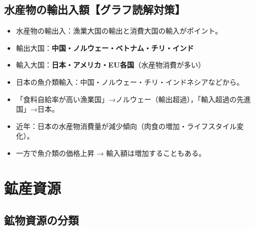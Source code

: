\documentclass[a4paper,11pt]{article}
\newcommand{\imp}[1]{\textbf{\textcolor{mainred}{#1}}}
\begin{document}
\vspace{2mm}

\subsection{水産物の輸出入額【グラフ読解対策】}

\begin{tcolorbox}[notebox, title={水産物の輸出入の統計判定ポイント}]
\begin{itemize}[leftmargin=1em]
  \item 水産物の輸出入：漁業大国の輸出と消費大国の輸入がポイント。
  \item 輸出大国：\imp{中国・ノルウェー・ベトナム・チリ・インド}
  \item 輸入大国：\imp{日本・アメリカ・EU各国}（水産物消費が多い）
  \item 日本の魚介類輸入：中国・ノルウェー・チリ・インドネシアなどから。
  \item 「食料自給率が高い漁業国」→ノルウェー（輸出超過），「輸入超過の先進国」→日本。
  \item 近年：日本の水産物消費量が減少傾向（肉食の増加・ライフスタイル変化）。
  \item 一方で魚介類の価格上昇 → 輸入額は増加することもある。
\end{itemize}
\end{tcolorbox}

\vspace{2mm}

\section{鉱産資源}

\subsection{鉱物資源の分類}
\end{document}
